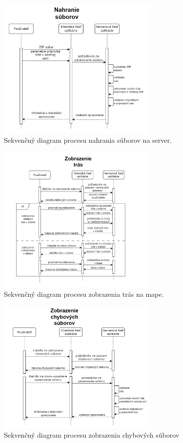 \begin{figure}[H]
    \centering
    \includegraphics[width=0.7\textwidth]{img/diagramy/sekvencny-nahranie.png}
    \caption{Sekvenčný diagram procesu nahrania súborov na server.}
    \label{fig:seq-upload-zip}
\end{figure}
\begin{figure}[H]
    \centering
    \includegraphics[width=0.7\textwidth]{img/diagramy/sekvencny-trasy.png}
    \caption{Sekvenčný diagram procesu zobrazenia trás na mape.}
    \label{fig:seq-show-routes}
\end{figure}
\begin{figure}[H]
    \centering
    \includegraphics[width=0.7\textwidth]{img/diagramy/sekvencny-chybove.png}
    \caption{Sekvenčný diagram procesu zobrazenia chybových súborov}
    \label{fig:seq-show-errors}
\end{figure}

